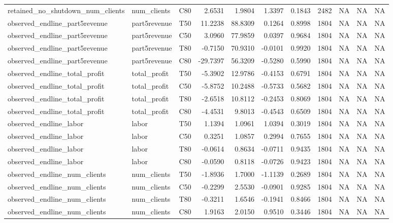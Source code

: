 \begin{table}
\begin{tabular}[t]{lllrrrrrrll}
\addlinespace
retained\_no\_shutdown\_num\_clients & num\_clients & C80 & 2.6531 & 1.9804 & 1.3397 & 0.1843 & 2482 & NA & NA & NA\\
observed\_endline\_part5revenue & part5revenue & T50 & 11.2238 & 88.8309 & 0.1264 & 0.8998 & 1804 & NA & NA & NA\\
observed\_endline\_part5revenue & part5revenue & C50 & 3.0960 & 77.9859 & 0.0397 & 0.9684 & 1804 & NA & NA & NA\\
observed\_endline\_part5revenue & part5revenue & T80 & -0.7150 & 70.9310 & -0.0101 & 0.9920 & 1804 & NA & NA & NA\\
observed\_endline\_part5revenue & part5revenue & C80 & -29.7397 & 56.3209 & -0.5280 & 0.5990 & 1804 & NA & NA & NA\\
\addlinespace
observed\_endline\_total\_profit & total\_profit & T50 & -5.3902 & 12.9786 & -0.4153 & 0.6791 & 1804 & NA & NA & NA\\
observed\_endline\_total\_profit & total\_profit & C50 & -5.8752 & 10.2488 & -0.5733 & 0.5682 & 1804 & NA & NA & NA\\
observed\_endline\_total\_profit & total\_profit & T80 & -2.6518 & 10.8112 & -0.2453 & 0.8069 & 1804 & NA & NA & NA\\
observed\_endline\_total\_profit & total\_profit & C80 & -4.4531 & 9.8013 & -0.4543 & 0.6509 & 1804 & NA & NA & NA\\
observed\_endline\_labor & labor & T50 & 1.1394 & 1.0961 & 1.0394 & 0.3019 & 1804 & NA & NA & NA\\
\addlinespace
observed\_endline\_labor & labor & C50 & 0.3251 & 1.0857 & 0.2994 & 0.7655 & 1804 & NA & NA & NA\\
observed\_endline\_labor & labor & T80 & -0.0614 & 0.8634 & -0.0711 & 0.9435 & 1804 & NA & NA & NA\\
observed\_endline\_labor & labor & C80 & -0.0590 & 0.8118 & -0.0726 & 0.9423 & 1804 & NA & NA & NA\\
observed\_endline\_num\_clients & num\_clients & T50 & -1.8936 & 1.7000 & -1.1139 & 0.2689 & 1804 & NA & NA & NA\\
observed\_endline\_num\_clients & num\_clients & C50 & -0.2299 & 2.5530 & -0.0901 & 0.9285 & 1804 & NA & NA & NA\\
\addlinespace
observed\_endline\_num\_clients & num\_clients & T80 & -0.3211 & 1.6546 & -0.1941 & 0.8466 & 1804 & NA & NA & NA\\
observed\_endline\_num\_clients & num\_clients & C80 & 1.9163 & 2.0150 & 0.9510 & 0.3446 & 1804 & NA & NA & NA\\
\bottomrule
\end{tabular}
\end{table}
